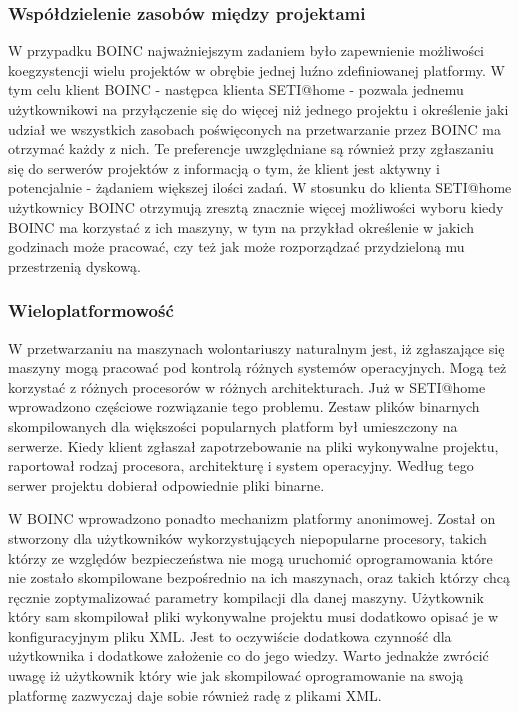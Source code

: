 \documentclass[12pt,a4paper,twoside]{article}
\begin{document}
\subsubsection{Współdzielenie zasobów między projektami}

W przypadku BOINC najważniejszym zadaniem było zapewnienie możliwości koegzystencji wielu projektów w obrębie jednej luźno zdefiniowanej platformy. W tym celu klient BOINC - następca klienta SETI@home - pozwala jednemu użytkownikowi na przyłączenie się do więcej niż jednego projektu i określenie jaki udział we wszystkich zasobach poświęconych na przetwarzanie przez BOINC ma otrzymać każdy z nich. Te preferencje uwzględniane są również przy zgłaszaniu się do serwerów projektów z informacją o tym, że klient jest aktywny i potencjalnie - żądaniem większej ilości zadań. W stosunku do klienta SETI@home użytkownicy BOINC otrzymują zresztą znacznie więcej możliwości wyboru kiedy BOINC ma korzystać z ich maszyny, w tym na przykład określenie w jakich godzinach może pracować, czy też jak może rozporządzać przydzieloną mu przestrzenią dyskową.

\subsubsection{Wieloplatformowość}

W przetwarzaniu na maszynach wolontariuszy naturalnym jest, iż zgłaszające się maszyny mogą pracować pod kontrolą różnych systemów operacyjnych. Mogą też korzystać z różnych procesorów w różnych architekturach. Już w SETI@home wprowadzono częściowe rozwiązanie tego problemu. Zestaw plików binarnych skompilowanych dla większości popularnych platform był umieszczony na serwerze. Kiedy klient zgłaszał zapotrzebowanie na pliki wykonywalne projektu, raportował rodzaj procesora, architekturę i system operacyjny. Według tego serwer projektu dobierał odpowiednie pliki binarne.

W BOINC wprowadzono ponadto mechanizm platformy anonimowej. Został on stworzony dla użytkowników wykorzystujących niepopularne procesory, takich którzy ze względów bezpieczeństwa nie mogą uruchomić oprogramowania które nie zostało skompilowane bezpośrednio na ich maszynach, oraz takich którzy chcą ręcznie zoptymalizować parametry kompilacji dla danej maszyny. Użytkownik który sam skompilował pliki wykonywalne projektu musi dodatkowo opisać je w konfiguracyjnym pliku XML. Jest to oczywiście dodatkowa czynność dla użytkownika i dodatkowe założenie co do jego wiedzy. Warto jednakże zwrócić uwagę iż użytkownik który wie jak skompilować oprogramowanie na swoją platformę zazwyczaj daje sobie również radę z plikami XML.
\end{document}
